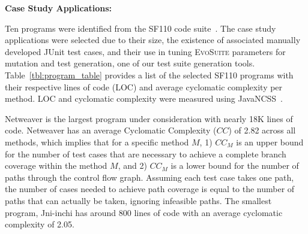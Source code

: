\noindent \textbf{Case Study Applications:}  

Ten programs were identified from the SF110 code suite~\cite{fraser:2012}.  The case study applications were selected due to their size, the existence of associated manually developed JUnit test cases, and their use in tuning \textsc{EvoSuite} parameters for mutation and test generation, one of our test suite generation tools.  Table~\ref{tbl:program_table} provides a list of the selected SF110 programs with their respective lines of code (LOC) and average cyclomatic complexity per method.  LOC and cyclomatic complexity were measured using JavaNCSS~\cite{leejavancss}.  

Netweaver is the largest program under consideration with nearly 18K lines of code.  Netweaver has an average Cyclomatic Complexity ($CC$) of 2.82 across all methods, which implies that for a specific method $M$, 1) $CC_M$ is an upper bound for the number of test cases that are necessary to achieve a complete branch coverage within the method $M$, and 2) $CC_M$ is a lower bound for the number of paths through the control flow graph. Assuming each test case takes one path, the number of cases needed to achieve path coverage is equal to the number of paths that can actually be taken, ignoring infeasible paths.  The smallest program, Jni-inchi has around 800 lines of code with an average cyclomatic complexity of 2.05.  

